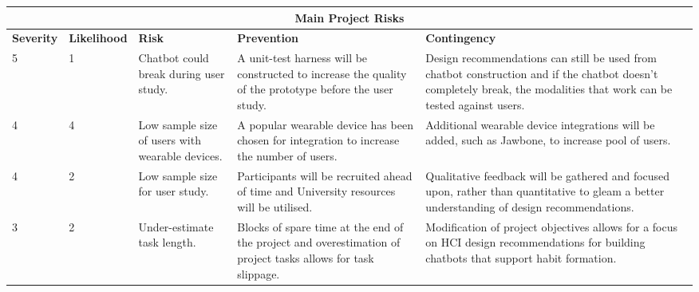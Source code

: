 \renewcommand{\arraystretch}{1.5} %

\begin{center}
\begin{tabular}{ |p{1.5cm}|p{1.9cm}|p{2.3cm}|p{3.3cm}|p{5cm}| }
  \hline \multicolumn{5}{|c|}{Main Project Risks} \\ \hline %
  \textbf{Severity} & \textbf{Likelihood} & \textbf{Risk} & \textbf{Prevention} & \textbf{Contingency} \\ \hline %
  5 & 1 & Chatbot could break during user study. & A unit-test harness will be constructed to increase the quality of the prototype before the user study. & Design recommendations can still be used from chatbot construction and if the chatbot doesn't completely break, the modalities that work can be tested against users. \\ \hline
  4 & 4 & Low sample size of users with wearable devices. & A popular wearable device has been chosen for integration to increase the number of users. & Additional wearable device integrations will be added, such as Jawbone, to increase pool of users. \\ \hline
  4 & 2 & Low sample size for user study. & Participants will be recruited ahead of time and University resources will be utilised. & Qualitative feedback will be gathered and focused upon, rather than quantitative to gleam a better understanding of design recommendations.\\ \hline
  3 & 2 & Under-estimate task length. & Blocks of spare time at the end of the project and overestimation of project tasks allows for task slippage. & Modification of project objectives allows for a focus on HCI design recommendations for building chatbots that support habit formation. \\ \hline
\end{tabular}
\end{center}

